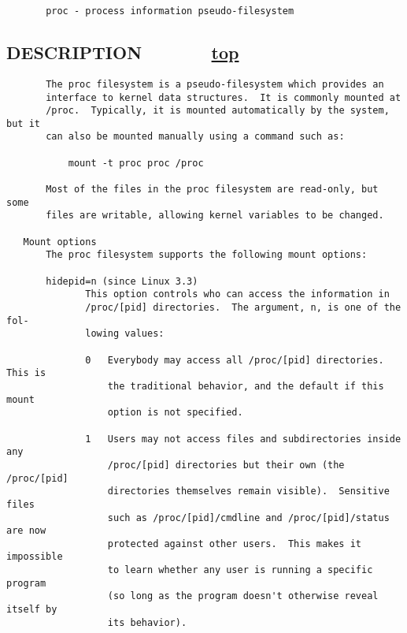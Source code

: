 \documentclass[]{article}
\begin{document}
\begin{verbatim}
       proc - process information pseudo-filesystem
\end{verbatim}

\subsection{\texorpdfstring{\protect\hyperlink{DESCRIPTION}{}DESCRIPTION
~ ~ ~ ~
\protect\hyperlink{top_of_page}{{top}}}{DESCRIPTION ~ ~ ~ ~ top}}\label{description-top}

\begin{verbatim}
       The proc filesystem is a pseudo-filesystem which provides an
       interface to kernel data structures.  It is commonly mounted at
       /proc.  Typically, it is mounted automatically by the system, but it
       can also be mounted manually using a command such as:

           mount -t proc proc /proc

       Most of the files in the proc filesystem are read-only, but some
       files are writable, allowing kernel variables to be changed.

   Mount options
       The proc filesystem supports the following mount options:

       hidepid=n (since Linux 3.3)
              This option controls who can access the information in
              /proc/[pid] directories.  The argument, n, is one of the fol‐
              lowing values:

              0   Everybody may access all /proc/[pid] directories.  This is
                  the traditional behavior, and the default if this mount
                  option is not specified.

              1   Users may not access files and subdirectories inside any
                  /proc/[pid] directories but their own (the /proc/[pid]
                  directories themselves remain visible).  Sensitive files
                  such as /proc/[pid]/cmdline and /proc/[pid]/status are now
                  protected against other users.  This makes it impossible
                  to learn whether any user is running a specific program
                  (so long as the program doesn't otherwise reveal itself by
                  its behavior).


\end{verbatim}
\end{document}
